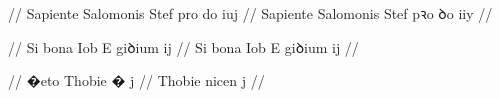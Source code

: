 \ex \bg
\gla
{} {} {} {} {} {} {} {} {} {}
{} {} {} {} {} {} {} {} {} {}
//
\glRekonstrukcja
Sapiente Salomonis Stef pro do iuj
//
\glU
{}
Sapiente Salomonis Stef pꝛo ꝺo iiy
//
\endgl
\xe

\ex \bg
\gla
{} {} {} {} {} {} {} {} {} {}
{} {} {} {} {} {} {} {} {} {}
//
\glRekonstrukcja
Si bona Iob E giꝺium ij
//
\glU
{}
Si bona Iob E giꝺium ij
//
\endgl
\xe

\ex \bg
\gla
{} {} {} {} {} {} {} {} {} {}
{} {} {} {} {} {} {} {} {} {}
//
\glRekonstrukcja
�eto Thobie � j
//
\glU
{}
{} Thobie nicen j
//
\endgl
\xe

\endinput





